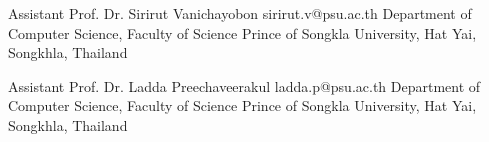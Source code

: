 	\cvref
		{Assistant Prof. Dr. Sirirut Vanichayobon}
		{sirirut.v@psu.ac.th}
		{Department of Computer Science, Faculty of Science}
		{Prince of Songkla University, Hat Yai, Songkhla, Thailand}
	
	\divider
	
	\cvref
		{Assistant Prof. Dr. Ladda Preechaveerakul}
		{ladda.p@psu.ac.th}
		{Department of Computer Science, Faculty of Science}
		{Prince of Songkla University, Hat Yai, Songkhla, Thailand}